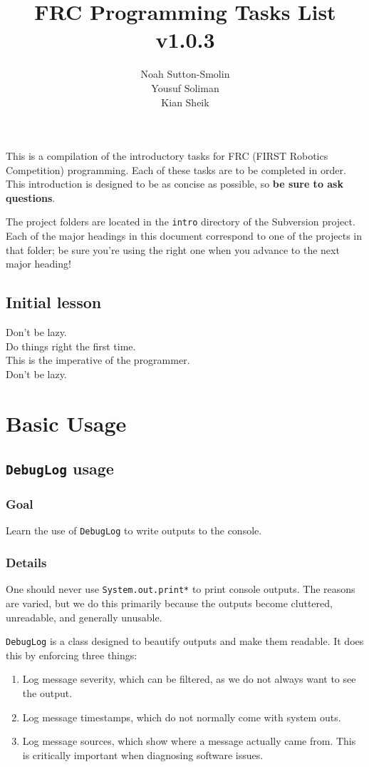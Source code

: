 \documentclass[a4paper]{article}
\title{FRC Programming Tasks List v1.0.3}
\author{Noah Sutton-Smolin\\Yousuf Soliman\\Kian Sheik}
\begin{document}
\setcounter{tocdepth}{2}\maketitle\tableofcontents\pagebreak

This is a compilation of the introductory tasks for FRC (FIRST Robotics Competition) programming. Each of these tasks are to be completed in order. This introduction is designed to be as concise as possible, so \textbf{be sure to ask questions}.

The project folders are located in the \lstinline{intro} directory of the Subversion project. Each of the major headings in this document correspond to one of the projects in that folder; be sure you're using the right one when you advance to the next major heading!

\subsection{Initial lesson}
Don't be lazy.\\Do things right the first time.\\This is the imperative of the programmer.\\Don't be lazy.

\pagebreak\section{Basic Usage}
\subsection{\lstinline{DebugLog} usage}
\subsubsection{Goal} Learn the use of \lstinline{DebugLog} to write outputs to the console.
\subsubsection{Details} One should never use \lstinline{System.out.print*} to print console outputs. The reasons are varied, but we do this primarily because the outputs become cluttered, unreadable, and generally unusable. 

\lstinline{DebugLog} is a class designed to beautify outputs and make them readable. It does this by enforcing three things:
\begin{enumerate}\item{Log message severity, which can be filtered, as we do not always want to see the output.}\item{Log message timestamps, which do not normally come with system outs.}\item{Log message sources, which show where a message actually came from. This is critically important when diagnosing software issues.}\end{enumerate}
\end{document}
